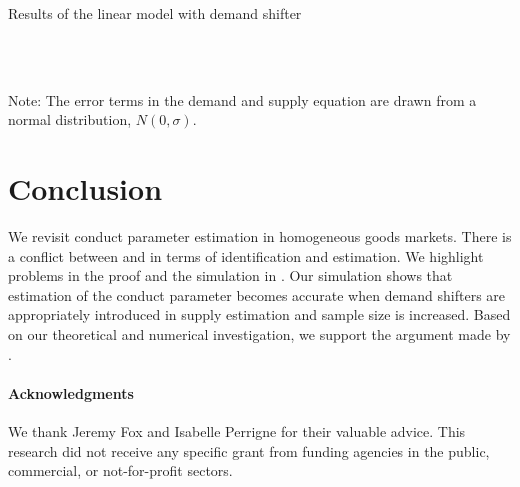 \documentclass[11pt, a4paper]{article}
\begin{document}
\begin{table}[!htbp]
  \begin{center}
      \caption{Results of the linear model with demand shifter}
      \label{tb:linear_linear_sigma_1} 
      \subfloat[$\sigma=0.001$]{}\\
      \subfloat[$\sigma=0.5$]{}\\
    \subfloat[$\sigma=2.0$]
    {}
  \end{center}
  \footnotesize
  Note: The error terms in the demand and supply equation are drawn from a normal distribution, $N(0,\sigma)$.
\end{table} 







\section{Conclusion}
We revisit conduct parameter estimation in homogeneous goods markets.
There is a conflict between \citet{bresnahan1982oligopoly} and \citet{perloff2012collinearity} in terms of identification and estimation.
We highlight problems in the proof and the simulation in \citet{perloff2012collinearity}.
Our simulation shows that estimation of the conduct parameter becomes accurate when demand shifters are appropriately introduced in supply estimation and sample size is increased. 
Based on our theoretical and numerical investigation, we support the argument made by \citet{bresnahan1982oligopoly}.


\paragraph{Acknowledgments}
We thank Jeremy Fox and Isabelle Perrigne for their valuable advice. This research did not receive any specific grant from funding agencies in the public, commercial, or not-for-profit sectors. 

\newpage





\newpage



\end{document}
